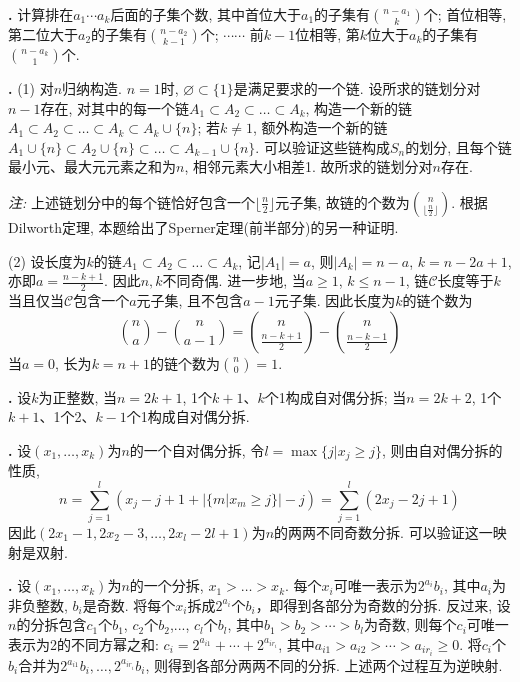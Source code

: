\par \textbf{\thesolenum .} \cite{IC} 计算排在$a_1\cdots a_k$后面的子集个数, 其中首位大于$a_1$的子集有$\binom{n-a_1}{k}$个; 首位相等, 第二位大于$a_2$的子集有$\binom{n-a_2}{k-1}$个; $\cdots\cdots$ 前$k-1$位相等, 第$k$位大于$a_k$的子集有$\binom{n-a_k}{1}$个. 

\par \textbf{\thesolenum .} (1) \cite{IC} 对$n$归纳构造. $n=1$时, $\varnothing \subset \{1\}$是满足要求的一个链. 设所求的链划分对$n-1$存在, 对其中的每一个链$A_1\subset A_2 \subset \dots \subset A_k$, 构造一个新的链$A_1\subset A_2 \subset \dots \subset A_k \subset A_k\cup \{n\}$; 若$k\neq 1$, 额外构造一个新的链$A_1\cup \{n\} \subset A_2 \cup \{n\}\subset \dots \subset A_{k-1}\cup \{n\}$. 可以验证这些链构成$S_n$的划分, 且每个链最小元、最大元元素之和为$n$, 相邻元素大小相差1. 故所求的链划分对$n$存在. 
\par \emph{注:} 上述链划分中的每个链恰好包含一个$\lfloor\frac{n}{2}\rfloor$元子集, 故链的个数为$\binom{n}{\lfloor\frac{n}{2}\rfloor}$. 根据Dilworth定理, 本题给出了Sperner定理(前半部分)的另一种证明. 
\par (2) 设长度为$k$的链$A_1\subset A_2\subset \dots \subset A_k$, 记$|A_1|=a$, 则$|A_k|=n-a$, $k=n-2a+1$, 亦即$a=\frac{n-k+1}{2}$. 因此$n,k$不同奇偶. 进一步地, 当$a\ge 1$, $k\le n-1$, 链$\mathcal{C}$长度等于$k$当且仅当$\mathcal{C}$包含一个$a$元子集, 且不包含$a-1$元子集. 因此长度为$k$的链个数为
\begin{displaymath}
    \binom{n}{a} - \binom{n}{a-1}=\binom{n}{\frac{n-k+1}{2}} - \binom{n}{\frac{n-k-1}{2}}
\end{displaymath}
当$a=0$, 长为$k=n+1$的链个数为$\binom{n}{0}=1$.

\par \textbf{\thesolenum .} 设$k$为正整数, 当$n=2k+1$, 1个$k+1$、$k$个1构成自对偶分拆; 当$n=2k+2$, 1个$k+1$、1个2、$k-1$个1构成自对偶分拆. 

\par \textbf{\thesolenum .} 设$(x_1,\dots,x_k)$为$n$的一个自对偶分拆, 令$l=\max\{j\vert x_j\ge j\}$, 则由自对偶分拆的性质,
\begin{equation*}
    n = \sum_{j=1}^l (x_j - j + 1 + |\{m\vert x_m\ge j\}| - j) = \sum_{j=1}^l (2x_j - 2j + 1)
\end{equation*}
因此$(2x_1-1, 2x_2-3, \dots, 2x_l - 2l +1)$为$n$的两两不同奇数分拆. 可以验证这一映射是双射. 

\par \textbf{\thesolenum .} 设$(x_1,\dots,x_k)$为$n$的一个分拆, $x_1>\dots>x_k$. 每个$x_i$可唯一表示为$2^{a_i} b_i$, 其中$a_i$为非负整数, $b_i$是奇数. 将每个$x_i$拆成$2^{a_i}$个$b_i$，即得到各部分为奇数的分拆. 反过来, 设$n$的分拆包含$c_1$个$b_1$, $c_2$个$b_2$,..., $c_l$个$b_l$, 其中$b_1>b_2>\cdots>b_l$为奇数, 则每个$c_i$可唯一表示为2的不同方幂之和: $c_i=2^{a_{i1}} +\cdots+ 2^{a_{ir_i}}$, 其中$a_{i1}>a_{i2}>\cdots>a_{ir_i}\ge 0$. 将$c_i$个$b_i$合并为$2^{a_{i1}}b_i, \dots,2^{a_{ir_i}}b_i$, 则得到各部分两两不同的分拆. 上述两个过程互为逆映射. 

